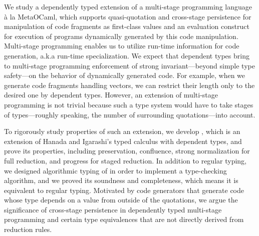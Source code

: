\documentclass[master,english]{kuisthesis}
\begin{document}
\date{Feburary 15, 2020}			%

\maketitle

\begin{eabstract}

We study a dependently typed extension of a multi-stage programming language \`a la MetaOCaml, which supports quasi-quotation and cross-stage persistence for manipulation of code fragments as first-class values and an evaluation construct for execution of programs dynamically generated by this code manipulation. Multi-stage programming enables us to utilize run-time information for code generation, a.k.a run-time specialization. We expect that dependent types bring to multi-stage programming enforcement of strong invariant---beyond simple type safety---on the behavior of dynamically generated code. For example, when we generate code fragments handling vectors, we can restrict their length only to the desired one by dependent types. However, an extension of multi-stage programming is not trivial because such a type system would have to take stages of types---roughly speaking, the number of surrounding quotations---into account.

To rigorously study properties of such an extension, we develop \LMD, which is an extension of Hanada and Igarashi's typed calculus \LTP with dependent types, and prove its properties, including preservation, confluence, strong normalization for full reduction, and progress for staged reduction. In addition to regular typing, we designed algorithmic typing of \LMD in order to implement a type-checking algorithm, and we proved its soundness and completeness, which means it is equivalent to regular typing. Motivated by code generators that generate code whose type depends on a value from outside of the quotations, we argue the significance of cross-stage persistence in dependently typed multi-stage programming and certain type equivalences that are not directly derived from reduction rules. 


\end{eabstract}
\end{document}
